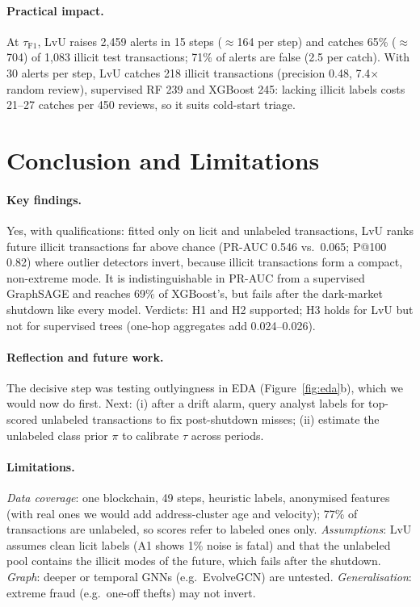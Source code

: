 \documentclass[11pt]{article}
\newcommand{\ours}{LvU}
\begin{document}
\paragraph{Practical impact.}
At $\tau_{\mathrm{F1}}$, \ours{} raises 2,459 alerts in 15 steps (${\approx}$164 per step) and catches 65\% (${\approx}$704) of 1,083 illicit test transactions; 71\% of alerts are false (2.5 per catch).
With 30 alerts per step, \ours{} catches 218 illicit transactions (precision 0.48, 7.4$\times$ random review), supervised RF 239 and XGBoost 245: lacking illicit labels costs 21--27 catches per 450 reviews, so it suits cold-start triage.

\section{Conclusion and Limitations}

\paragraph{Key findings.}
Yes, with qualifications: fitted only on licit and unlabeled transactions, \ours{} ranks future illicit transactions far above chance (PR-AUC 0.546 vs.\ 0.065; P@100 0.82) where outlier detectors invert, because illicit transactions form a compact, non-extreme mode.
It is indistinguishable in PR-AUC from a supervised GraphSAGE and reaches 69\% of XGBoost's, but fails after the dark-market shutdown like every model.
Verdicts: H1 and H2 supported; H3 holds for \ours{} but not for supervised trees (one-hop aggregates add 0.024--0.026).

\paragraph{Reflection and future work.}
The decisive step was testing outlyingness in EDA (Figure~\ref{fig:eda}b), which we would now do first.
Next: (i) after a drift alarm, query analyst labels for top-scored unlabeled transactions to fix post-shutdown misses; (ii) estimate the unlabeled class prior $\pi$ \citep{bekker2020pu} to calibrate $\tau$ across periods.

\paragraph{Limitations.}
\emph{Data coverage}: one blockchain, 49 steps, heuristic labels, anonymised features (with real ones we would add address-cluster age and velocity); 77\% of transactions are unlabeled, so scores refer to labeled ones only.
\emph{Assumptions}: \ours{} assumes clean licit labels (A1 shows 1\% noise is fatal) and that the unlabeled pool contains the illicit modes of the future, which fails after the shutdown.
\emph{Graph}: deeper or temporal GNNs (e.g.\ EvolveGCN) are untested.
\emph{Generalisation}: extreme fraud (e.g.\ one-off thefts) may not invert.
\end{document}
